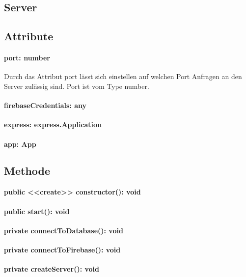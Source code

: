 \documentclass[parskip=full]{scrartcl}
\begin{document}
\subsection{Server}
\subsection*{Attribute}
\paragraph{port: number} Durch das Attribut port lässt sich einstellen auf welchen Port Anfragen an den Server zulässig sind.
Port ist vom Type number.
\paragraph{firebaseCredentials: any}
\paragraph{express: express.Application}
\paragraph{app: App}
\paragraph{}

\subsection*{Methode}
\paragraph{public <<create>> constructor(): void}
\paragraph{public start(): void}
\paragraph{private connectToDatabase(): void}
\paragraph{private connectToFirebase(): void}
\paragraph{private createServer(): void}
\end{document}
